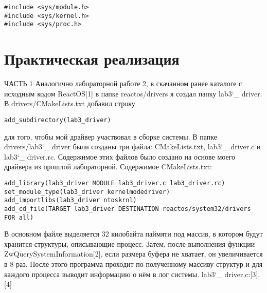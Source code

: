 \documentclass[a4paper, 14pt]{extarticle}
\begin{document}
\begin{flushleft}
\begin{verbatim}
#include <sys/module.h>
#include <sys/kernel.h>
#include <sys/proc.h>
\end{verbatim}

\end{flushleft}
\pagebreak

\section{Практическая реализация} \label{sec:Realization}
\begin{flushleft}
ЧАСТЬ 1 \newline
Аналогично лабораторной работе 2, в скачанном ранее каталоге с исходным кодом ReactOS[1] в папке reactos/drivers я создал папку lab3\char`_ driver. В drivers/CMakeLists.txt добавил строку 
\end{flushleft}

\begin{verbatim}
add_subdirectory(lab3_driver)
\end{verbatim}

\begin{flushleft}
 для того, чтобы мой драйвер участвовал в сборке
системы. В папке drivers/lab3\char`_ driver были созданы три файла: CMakeLists.txt, lab3\char`_ driver.c и lab3\char`_ driver.rc. Содержимое этих файлов было создано на основе моего драйвера из прошлой лабораторной. Содержимое CMakeLists.txt:
\end{flushleft}

\begin{verbatim}
add_library(lab3_driver MODULE lab3_driver.c lab3_driver.rc)
set_module_type(lab3_driver kernelmodedriver)
add_importlibs(lab3_driver ntoskrnl)
add_cd_file(TARGET lab3_driver DESTINATION reactos/system32/drivers FOR all)
\end{verbatim}

\begin{flushleft}
В основном файле выделяется 32 килобайта паймяти под массив, в котором будут хранится структуры, описывающие процесс. Затем, после выполнения функции ZwQuerySystemInformation[2], если размера буфера не хватает, он увеличивается в 8 раз. После этого программа проходит по полученному массиву структур и для каждого процесса выводит информацию о нём в лог системы.
lab3\char`_ driver.c:[3],[4]
\end{flushleft}
\end{document}
